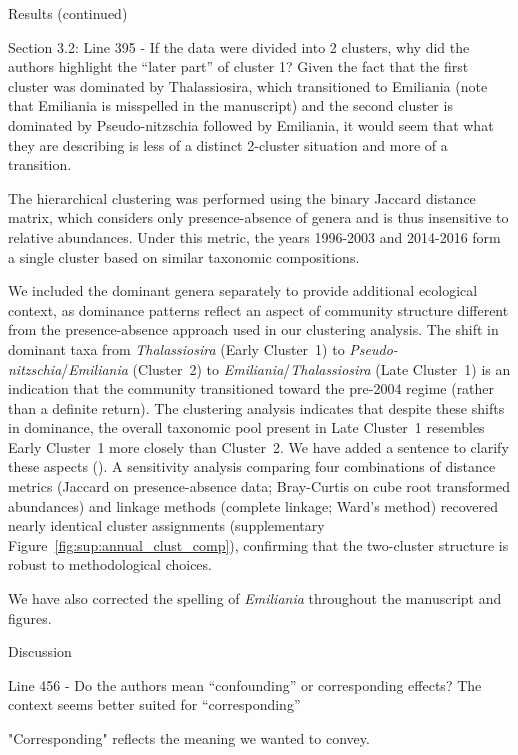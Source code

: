\documentclass[12pt,english]{reviewresponse}
\begin{document}
\begin{revcomment}\label{comment:clustering-dominance}
	Results (continued)

    Section 3.2:
    Line 395 - If the data were divided into 2 clusters, why did the authors highlight the “later part” of cluster 1? Given the fact that the first cluster was dominated by Thalassiosira, which transitioned to Emiliania (note that Emiliania is misspelled in the manuscript) and the second cluster is dominated by Pseudo-nitzschia followed by Emiliania, it would seem that what they are describing is less of a distinct 2-cluster situation and more of a transition.
\end{revcomment}
\begin{revresponse}
    The hierarchical clustering was performed using the binary Jaccard distance matrix, which considers only presence-absence of genera and is thus insensitive to relative abundances. Under this metric, the years 1996-2003 and 2014-2016 form a single cluster based on similar taxonomic compositions.
    
    We included the dominant genera separately to provide additional ecological context, as dominance patterns reflect an aspect of community structure different from the presence-absence approach used in our clustering analysis. The shift in dominant taxa from \textit{Thalassiosira} (Early Cluster~1) to \textit{Pseudo-nitzschia}/\textit{Emiliania} (Cluster~2) to \textit{Emiliania}/\textit{Thalassiosira} (Late Cluster~1)  is an indication that the community transitioned toward the pre-2004 regime (rather than a definite return). The clustering analysis indicates that despite these shifts in dominance, the overall taxonomic pool present in Late Cluster~1 resembles Early Cluster~1 more closely than Cluster~2. We have added a sentence to clarify these aspects (). A sensitivity analysis comparing four combinations of distance metrics (Jaccard on presence-absence data; Bray-Curtis on cube root transformed abundances) and linkage methods (complete linkage; Ward's method) recovered nearly identical cluster assignments (supplementary Figure~\ref{fig:sup:annual_clust_comp}), confirming that the two-cluster structure is robust to methodological choices.
    
    We have also corrected the spelling of \textit{Emiliania} throughout the manuscript and figures.
\end{revresponse}


\begin{revcomment}
	Discussion

    Line 456 - Do the authors mean “confounding” or corresponding effects? The context seems better suited for “corresponding”
\end{revcomment}
\begin{revresponse}
	"Corresponding" reflects the meaning we wanted to convey. 
\end{revresponse}
\end{document}
